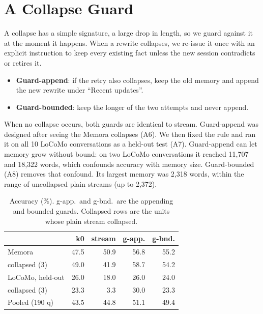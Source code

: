 \documentclass[11pt]{article}
\begin{document}
\section{A Collapse Guard}\label{sec:guard}
A collapse has a simple signature, a large drop in length, so we guard against it at the moment it happens. When a rewrite collapses, we re-issue it once with an explicit instruction to keep every existing fact unless the new session contradicts or retires it.
\begin{itemize}
\item \textbf{Guard-append}: if the retry also collapses, keep the old memory and append the new rewrite under ``Recent updates''.
\item \textbf{Guard-bounded}: keep the longer of the two attempts and never append.
\end{itemize}
When no collapse occurs, both guards are identical to stream. Guard-append was designed after seeing the Memora collapses (A6). We then fixed the rule and ran it on all 10 LoCoMo conversations as a held-out test (A7). Guard-append can let memory grow without bound: on two LoCoMo conversations it reached 11,707 and 18,322 words, which confounds accuracy with memory size. Guard-bounded (A8) removes that confound. Its largest memory was 2,318 words, within the range of uncollapsed plain streams (up to 2,372).

\begin{table}[t]
\centering\small
\setlength{\tabcolsep}{4pt}
\begin{tabular}{lrrrr}
\toprule
 & k0 & stream & g-app. & g-bnd. \\
\midrule
Memora & 47.5 & 50.9 & 56.8 & 55.2 \\
\quad collapsed (3) & 49.0 & 41.9 & 58.7 & 54.2 \\
LoCoMo, held-out & 26.0 & 18.0 & 26.0 & 24.0 \\
\quad collapsed (3) & 23.3 & 3.3 & 30.0 & 23.3 \\
Pooled (190 q) & 43.5 & 44.8 & 51.1 & 49.4 \\
\bottomrule
\end{tabular}
\caption{Accuracy (\%). g-app.\ and g-bnd.\ are the appending and bounded guards. Collapsed rows are the units whose plain stream collapsed.}
\label{tab:main}
\end{table}
\end{document}
